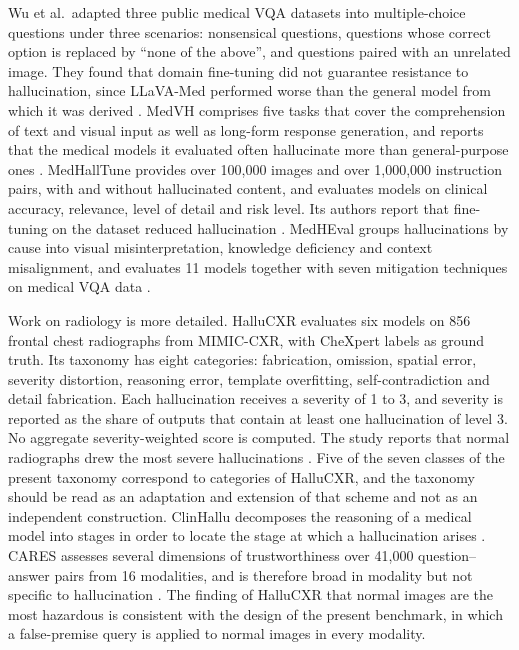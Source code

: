 Wu et al.\ adapted three public medical VQA datasets into multiple-choice questions under three scenarios: nonsensical questions, questions whose correct option is replaced by ``none of the above'', and questions paired with an unrelated image. They found that domain fine-tuning did not guarantee resistance to hallucination, since LLaVA-Med performed worse than the general model from which it was derived \citep{wu2024halluvqa}. MedVH comprises five tasks that cover the comprehension of text and visual input as well as long-form response generation, and reports that the medical models it evaluated often hallucinate more than general-purpose ones \citep{gu2024medvh}. MedHallTune provides over 100,000 images and over 1,000,000 instruction pairs, with and without hallucinated content, and evaluates models on clinical accuracy, relevance, level of detail and risk level. Its authors report that fine-tuning on the dataset reduced hallucination \citep{yan2025medhalltune}. MedHEval groups hallucinations by cause into visual misinterpretation, knowledge deficiency and context misalignment, and evaluates 11 models together with seven mitigation techniques on medical VQA data \citep{chang2025medheval}.

Work on radiology is more detailed. HalluCXR evaluates six models on 856 frontal chest radiographs from MIMIC-CXR, with CheXpert labels as ground truth. Its taxonomy has eight categories: fabrication, omission, spatial error, severity distortion, reasoning error, template overfitting, self-contradiction and detail fabrication. Each hallucination receives a severity of 1 to 3, and severity is reported as the share of outputs that contain at least one hallucination of level 3. No aggregate severity-weighted score is computed. The study reports that normal radiographs drew the most severe hallucinations \citep{wang2026hallucxr}. Five of the seven classes of the present taxonomy correspond to categories of HalluCXR, and the taxonomy should be read as an adaptation and extension of that scheme and not as an independent construction. ClinHallu decomposes the reasoning of a medical model into stages in order to locate the stage at which a hallucination arises \citep{yang2026clinhallu}. CARES assesses several dimensions of trustworthiness over 41,000 question--answer pairs from 16 modalities, and is therefore broad in modality but not specific to hallucination \citep{xia2024cares}. The finding of HalluCXR that normal images are the most hazardous is consistent with the design of the present benchmark, in which a false-premise query is applied to normal images in every modality.

